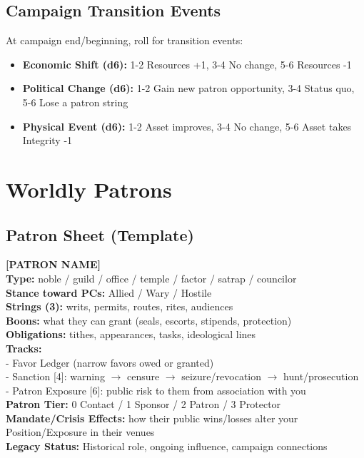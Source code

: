   \subsection{Campaign Transition Events}
  At campaign end/beginning, roll for transition events:
  \begin{itemize}
    \item \textbf{Economic Shift (d6):} 1-2 Resources +1, 3-4 No change, 5-6 Resources -1
    \item \textbf{Political Change (d6):} 1-2 Gain new patron opportunity, 3-4 Status quo, 5-6 Lose a patron string
    \item \textbf{Physical Event (d6):} 1-2 Asset improves, 3-4 No change, 5-6 Asset takes Integrity -1
  \end{itemize}
  
  \section{Worldly Patrons}
  \subsection{Patron Sheet (Template)}
  \begin{framed}
  \noindent\textbf{[PATRON NAME]}\\
  \textbf{Type:} noble / guild / office / temple / factor / satrap / councilor\\
  \textbf{Stance toward PCs:} Allied / Wary / Hostile\\
  \textbf{Strings (3):} writs, permits, routes, rites, audiences\\
  \textbf{Boons:} what they can grant (seals, escorts, stipends, protection)\\
  \textbf{Obligations:} tithes, appearances, tasks, ideological lines\\
  \textbf{Tracks:}\\
  \hspace{10pt}- Favor Ledger (narrow favors owed or granted)\\
  \hspace{10pt}- Sanction [4]: warning $\rightarrow$ censure $\rightarrow$ seizure/revocation $\rightarrow$ hunt/prosecution\\
  \hspace{10pt}- Patron Exposure [6]: public risk to them from association with you\\
  \textbf{Patron Tier:} 0 Contact / 1 Sponsor / 2 Patron / 3 Protector\\
  \textbf{Mandate/Crisis Effects:} how their public wins/losses alter your Position/Exposure in their venues\\
  \textbf{Legacy Status:} Historical role, ongoing influence, campaign connections
  \end{framed}
  
